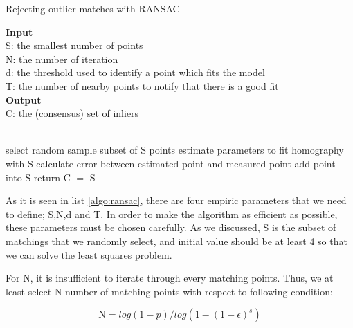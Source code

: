 \documentclass[a4paper]{report}
\numberwithin{figure}{section}
\begin{document}
\begin{algorithm}[H]
  \caption{Rejecting outlier matches with RANSAC}
	\label{algo:ransac}
  \textbf{Input} \\
    \hspace*{\algorithmicindent}S: the smallest number of points\\
    \hspace*{\algorithmicindent}N: the number of iteration\\
    \hspace*{\algorithmicindent}d: the threshold used to identify a point which fits the model\\
    \hspace*{\algorithmicindent}T: the number of nearby points to notify that there is a good fit\\
  \textbf{Output} \\
    \hspace*{\algorithmicindent}C: the (consensus) set of inliers \\
  \begin{algorithmic}[1]

    \\
      \State select random sample subset of S points
      \State estimate parameters to fit homography with S
        \State calculate error between estimated point and measured point
          \State add point into S
        \EndIf
          \State return C $=$ S
        \EndIf
      \EndFor
      \EndWhile
    \EndProcedure
  \end{algorithmic}
\end{algorithm}

As it is seen in list \ref{algo:ransac}, there are four empiric parameters 
that we 
need to define; S,N,d and T. In order to make the algorithm as efficient as 
possible, these parameters must be chosen carefully. As we discussed, S is the 
subset of matchings that we randomly select, and initial value should be at 
least 4 so that we can solve the least squares problem. 

For N, it is insufficient to iterate through every matching points. Thus, we 
at least select N number of matching points with respect to following 
condition:

\begin{equation}
  \text{N} = log(1-p)/log(1-(1-\epsilon)^s)
\end{equation}
\end{document}
